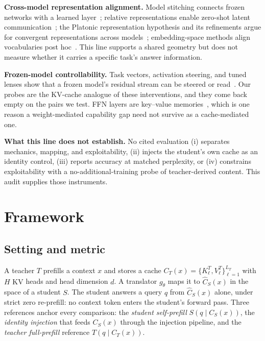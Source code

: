 \documentclass[10pt]{article}
\newcommand{\kv}{\ensuremath{\mathrm{KV}}}
\begin{document}
\textbf{Cross-model representation alignment.} Model stitching connects frozen
networks with a learned layer~\citep{stitching2021}; relative representations
enable zero-shot latent communication~\citep{relrep2022}; the Platonic
representation hypothesis and its refinements argue for convergent
representations across models~\citep{platonic2024,perfectplatonic2025,aristotelian2026};
embedding-space methods align vocabularies post hoc~\citep{vec2vec2025}. This
line supports a shared geometry but does not measure whether it carries a
specific task's answer information.

\textbf{Frozen-model controllability.} Task vectors, activation steering, and
tuned lenses show that a frozen model's residual stream can be steered or
read~\citep{taskvectors2023,actsteer2024,tunedlens2023,gist2023}. Our probes are
the \kv{}-cache analogue of these interventions, and they come back empty on the
pairs we test. FFN layers are key--value memories~\citep{ffnmemory2021}, which is
one reason a weight-mediated capability gap need not survive as a cache-mediated
one.

\textbf{What this line does not establish.} No cited evaluation (i) separates
mechanics, mapping, and exploitability, (ii) injects the student's own cache as
an identity control, (iii) reports accuracy at matched perplexity, or (iv)
constrains exploitability with a no-additional-training probe of teacher-derived
content. This audit supplies those instruments.


\section{Framework}
\label{sec:framework}

\subsection{Setting and metric}
A teacher $T$ prefills a context $x$ and stores a cache
$C_T(x)=\{K^T_\ell,V^T_\ell\}_{\ell=1}^{L_T}$ with $H$ \kv{} heads and head
dimension $d$. A translator $g_\theta$ maps it to $\widehat C_S(x)$ in the space
of a student $S$. The student answers a query $q$ from
$\widehat C_S(x)$ alone, under strict zero re-prefill: no context token enters
the student's forward pass. Three references anchor every comparison: the
\emph{student self-prefill} $S(q\mid C_S(x))$, the \emph{identity injection}
that feeds $C_S(x)$ through the injection pipeline, and the \emph{teacher
full-prefill} reference $T(q\mid C_T(x))$.
\end{document}
